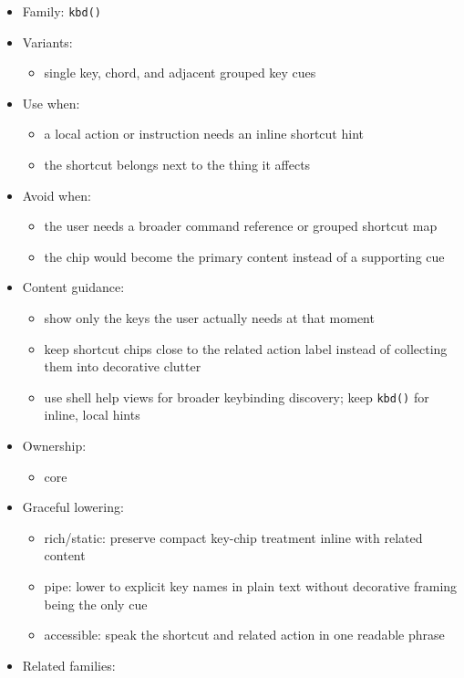 \begin{itemize}
\tightlist
\item
  Family: \texttt{k\allowbreak{}b\allowbreak{}d\allowbreak{}(\allowbreak{})}
\item
  Variants:

  \begin{itemize}
  \tightlist
  \item
    single key, chord, and adjacent grouped key cues
  \end{itemize}
\item
  Use when:

  \begin{itemize}
  \tightlist
  \item
    a local action or instruction needs an inline shortcut hint
  \item
    the shortcut belongs next to the thing it affects
  \end{itemize}
\item
  Avoid when:

  \begin{itemize}
  \tightlist
  \item
    the user needs a broader command reference or grouped shortcut map
  \item
    the chip would become the primary content instead of a supporting cue
  \end{itemize}
\item
  Content guidance:

  \begin{itemize}
  \tightlist
  \item
    show only the keys the user actually needs at that moment
  \item
    keep shortcut chips close to the related action label instead of collecting them into decorative clutter
  \item
    use shell help views for broader keybinding discovery; keep \texttt{k\allowbreak{}b\allowbreak{}d\allowbreak{}(\allowbreak{})} for inline, local hints
  \end{itemize}
\item
  Ownership:

  \begin{itemize}
  \tightlist
  \item
    core
  \end{itemize}
\item
  Graceful lowering:

  \begin{itemize}
  \tightlist
  \item
    rich/static: preserve compact key-chip treatment inline with related content
  \item
    pipe: lower to explicit key names in plain text without decorative framing being the only cue
  \item
    accessible: speak the shortcut and related action in one readable phrase
  \end{itemize}
\item
  Related families:


\end{itemize}
